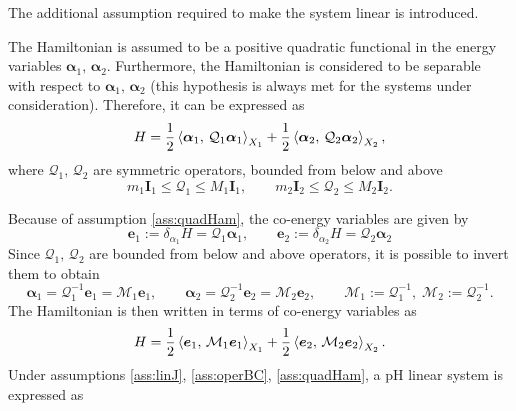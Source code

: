 The additional assumption required to make the system linear is introduced.

\begin{assumption}\label{ass:quadHam}
	The Hamiltonian is assumed to be a positive quadratic functional in the energy variables $\bm{\alpha}_1, \, \bm{\alpha}_2$. Furthermore, the Hamiltonian is considered to be separable  with respect to $\bm{\alpha}_1, \, \bm{\alpha}_2$ (this hypothesis is always met for the systems under consideration). Therefore, it can be expressed as 
	\begin{equation}
		H = \frac{1}{2} \inner[X_1]{\bm{\alpha}_{1}}{\mathcal{Q}_1\bm{\alpha}_{1}} + \frac{1}{2} \inner[X_2]{\bm{\alpha}_{2}}{\mathcal{Q}_2\bm{\alpha}_{2}},
	\end{equation}
	where $\mathcal{Q}_1, \, \mathcal{Q}_2$ are symmetric operators, bounded from below and above
	\begin{equation*}
	m_1 \bm{I}_1 \le\mathcal{Q}_1 \le M_1 \bm{I}_1, \qquad  m_2 \bm{I}_2 \le \mathcal{Q}_2 \le M_2 \bm{I}_2.
	\end{equation*} 
\end{assumption}

Because of assumption \ref{ass:quadHam}, the co-energy variables are given by 
\begin{equation}\label{eq:e_lin}
	\bm{e}_1 := \delta_{\alpha_1} H = \mathcal{Q}_1 \bm{\alpha}_1, \qquad \bm{e}_2 := \delta_{\alpha_2} H = \mathcal{Q}_2 \bm{\alpha}_2
\end{equation}
Since $\mathcal{Q}_1, \, \mathcal{Q}_2$ are bounded from below and above operators, it is possible to invert them to obtain
\begin{equation}\label{eq:alpha_lin}
\bm{\alpha}_1 = \mathcal{Q}_1^{-1}\bm{e}_1 = \mathcal{M}_1\bm{e}_1, \qquad  \bm{\alpha}_2 = \mathcal{Q}_2^{-1} \bm{e}_2 = \mathcal{M}_2 \bm{e}_2, \qquad \mathcal{M}_1 := \mathcal{Q}_1^{-1}, \; \mathcal{M}_2 := \mathcal{Q}_2^{-1}.
\end{equation}
The Hamiltonian is then written in terms of co-energy variables as 
\begin{equation}\label{eq:H_coenergy}
H = \frac{1}{2} \inner[X_1]{\bm{e}_{1}}{\mathcal{M}_1\bm{e}_{1}} + \frac{1}{2} \inner[X_2]{\bm{e}_{2}}{\mathcal{M}_2\bm{e}_{2}}.
\end{equation}
Under assumptions \ref{ass:linJ}, \ref{ass:operBC}, \ref{ass:quadHam}, a pH linear system is expressed as 

